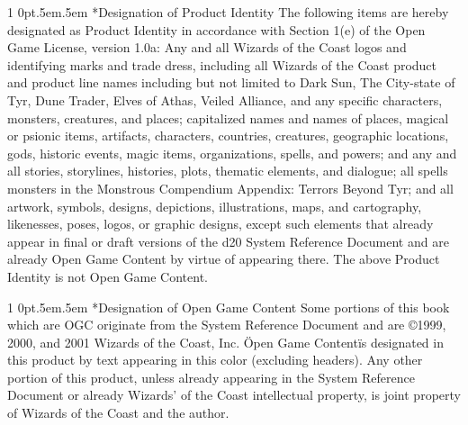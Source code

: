 \documentclass[onecolumn,oneside]{d20}
\makeatletter
\renewcommand\section{
  \@startsection{section}
  {1}
  {0pt}{.5em}{.5em}{\color{ChapterColor}\Large\scshape\raggedleft\imfellEnglish}
}
\makeatother
\begin{document}
\section*{Designation of Product Identity}
The following items are hereby designated as Product Identity in accordance with Section 1(e) of the Open Game License, version 1.0a: Any and all Wizards of the Coast logos and identifying marks and trade dress, including all Wizards of the Coast product and product line names including but not limited to Dark Sun, The City-state of Tyr, Dune Trader, Elves of Athas, Veiled Alliance, and any specific characters, monsters, creatures, and places; capitalized names and names of places, magical or psionic items, artifacts, characters, countries, creatures, geographic locations, gods, historic events, magic items, organizations, spells, and powers; and any and all stories, storylines, histories, plots, thematic elements, and dialogue; all spells monsters in the Monstrous Compendium Appendix: Terrors Beyond Tyr; and all artwork, symbols, designs, depictions, illustrations, maps, and cartography, likenesses, poses, logos, or graphic designs, except such elements that already appear in final or draft versions of the d20 System Reference Document and are already Open Game Content by virtue of appearing there. The above Product Identity is not Open Game Content.

\section*{Designation of Open Game Content}
Some portions of this book which are OGC originate from the System Reference Document and are ©1999, 2000, and 2001 Wizards of the Coast, Inc. \"Open Game Content\" is designated in this product by text appearing in this color (excluding headers). Any other portion of this product, unless already appearing in the System Reference Document or already Wizards' of the Coast intellectual property, is joint property of Wizards of the Coast and the author.
\end{document}
